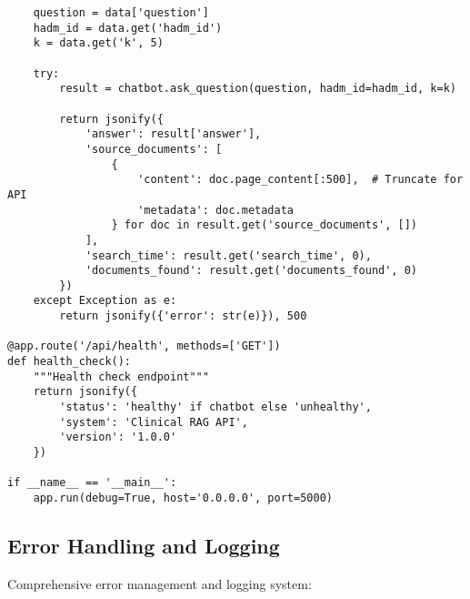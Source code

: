 \begin{verbatim}
    question = data['question']
    hadm_id = data.get('hadm_id')
    k = data.get('k', 5)

    try:
        result = chatbot.ask_question(question, hadm_id=hadm_id, k=k)
        
        return jsonify({
            'answer': result['answer'],
            'source_documents': [
                {
                    'content': doc.page_content[:500],  # Truncate for API
                    'metadata': doc.metadata
                } for doc in result.get('source_documents', [])
            ],
            'search_time': result.get('search_time', 0),
            'documents_found': result.get('documents_found', 0)
        })
    except Exception as e:
        return jsonify({'error': str(e)}), 500

@app.route('/api/health', methods=['GET'])
def health_check():
    """Health check endpoint"""
    return jsonify({
        'status': 'healthy' if chatbot else 'unhealthy',
        'system': 'Clinical RAG API',
        'version': '1.0.0'
    })

if __name__ == '__main__':
    app.run(debug=True, host='0.0.0.0', port=5000)
\end{verbatim}

\subsection{Error Handling and Logging}

Comprehensive error management and logging system:

